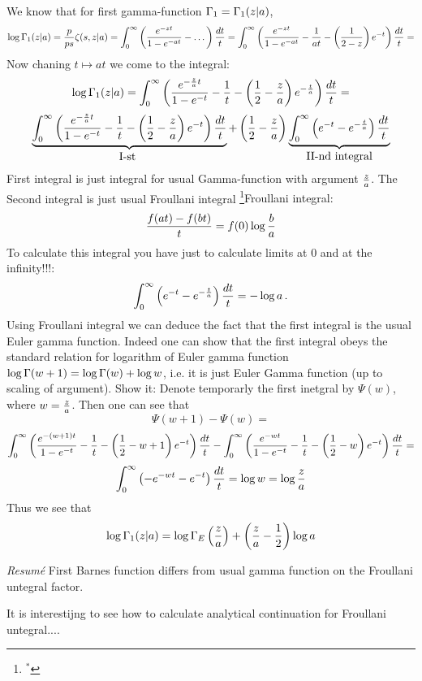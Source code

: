    We know that for first gamma-function ${\Gamma}_1={\Gamma}_1(z|a)$,
  $$
\log{\Gamma}_1(z|a)={p\over p s}\zeta(s,z|a)=
  \int_0^\infty\left({e^{-zt}\over 1-e^{-at}}-\dots\right){dt\over t}= 
  \int_0^\infty\left({e^{-zt}\over 1-e^{-at}}-{1\over at}-
\left({1\over 2-z}\right)e^{-t}\right){dt\over t}= 
  $$
Now chaning $t\mapsto at$ we come to the integral:
 $$
\log{\Gamma}_1(z|a)=
  \int_0^\infty\left({e^{-{z\over a}t}\over 1-e^{-t}}-{1\over t}-
\left({1\over 2}-{z\over a}\right)e^{-{t\over a}}\right){dt\over t}= 
  $$
   $$
   \underbrace
       {
 \int_0^\infty\left({e^{-{z\over a}t}\over 1-e^{-t}}-{1\over t}-
\left({1\over 2}-{z\over a}\right)e^{-t}\right){dt\over t} 
       }
       _{\hbox{I-st }}+
   \left({1\over 2}-{z\over a}\right)
        \underbrace
             {
   \int_0^\infty\left(e^{-t}-e^{-{t\over a}}\right)
            {dt\over t}
           }_{\hbox {II-nd integral}} 
  $$
  First integral is just integral for usual Gamma-function
with argument $z\over a$.  The
Second integral is just usual Froullani integral
\footnote{$^*$}{Froullani integral:
      $$
    {f(at)-f(bt)\over t}=f(0)\log {b\over a}
       $$
To calculate this integral you have just to calculate limits at 
$0$ and at the infinity!!!}:
     $$
 \int_0^\infty\left(e^{-t}-e^{-{t\over a}}\right)
            {dt\over t}
    =-\log a\,.
     $$
Using Froullani integral we can deduce the fact that the first integral
is the usual Euler gamma function. 
Indeed one can show that the first integral obeys the 
standard relation for logarithm of Euler 
gamma function   $\log{\Gamma}(w+1)=\log{\Gamma}(w)+\log w$, i.e. it is just 
Euler Gamma function (up to scaling of argument).
 Show it: Denote temporarly the first inetgral by
  $\Psi (w)$, where $w={z\over a}$.
   Then one can see that
         $$
\Psi(w+1)-\Psi (w)=
   $$
   $$
 \int_0^\infty\left({e^{-(w+1)t}\over 1-e^{-t}}-{1\over t}-
\left({1\over 2}-{w+1}\right)e^{-t}\right){dt\over t}- 
    \int_0^\infty\left({e^{-wt}\over 1-e^{-t}}-{1\over t}-
\left({1\over 2}-w\right)e^{-t}\right){dt\over t}= 
          $$
    $$
\int_0^\infty\left(-e^{-wt}-e^{-t}\right){dt\over t}=\log w=\log {z\over a}
   $$
Thus we see that
        $$
\log {\Gamma}_1(z|a)=\log\Gamma_E\left({z\over a}\right)+
    \left({z\over a}-{1\over 2}\right)\log a
         $$

{\sl Resum\'e}  First Barnes function differs from usual gamma function
on the Froullani untegral factor. 

It is interestijng to see how to calculate analytical continuation for 
Froullani untegral....
\bye
